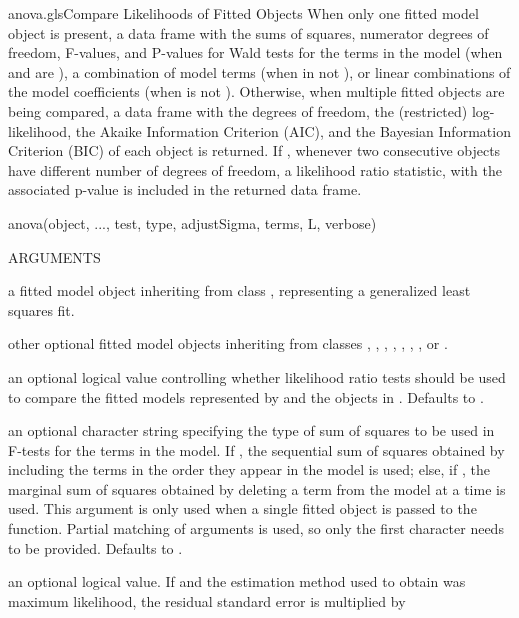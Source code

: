 \documentclass[pdftex]{article} \usepackage{url,graphicx}
\begin{document}
\begin{Helpfile}{anova.gls}{Compare Likelihoods of Fitted Objects}
When only one fitted model object is present, a data frame with the
sums of squares, numerator degrees of freedom, F-values, and P-values
for Wald tests for the terms in the model (when  and
 are ), a combination of model terms (when
 in not ), or linear combinations of the model
coefficients (when  is not ). Otherwise, when
multiple fitted objects are being compared, a data frame with
the degrees of freedom, the (restricted) log-likelihood, the 
Akaike Information Criterion (AIC), and the Bayesian Information
Criterion (BIC) of each object is returned. If ,
whenever two consecutive  objects have different number of degrees of
freedom, a likelihood ratio statistic, with the associated p-value is
included in the returned data frame.
\begin{Example}
anova(object, ..., test, type, adjustSigma, terms, L, verbose)
\end{Example}
\begin{Argument}{ARGUMENTS}
\item[\Co{object:}]
a fitted model object inheriting from class ,
representing a generalized least squares fit.
\item[\Co{...:}]
other optional fitted model objects inheriting from
classes , , , ,
, , , or .
\item[\Co{test:}]
an optional logical value controlling whether likelihood
ratio tests should be used to compare the fitted models represented
by  and the objects in . Defaults to
.
\item[\Co{type:}]
an optional character string specifying the type of sum of
squares to be used in F-tests for the terms in the model. If 
, the sequential sum of squares obtained by
including the terms in the order they appear in the model is used;
else, if , the marginal sum of squares
obtained by deleting a term from the model at a time is used. This
argument is only used when a single fitted object is passed to the
function. Partial matching of arguments is used, so only the first
character needs to be provided. Defaults to .
\item[\Co{adjustSigma:}] an optional logical value. If  and
  the estimation method used to obtain  was maximum
  likelihood, the residual standard error is multiplied by

\end{Argument}
\end{Helpfile}
\end{document}
